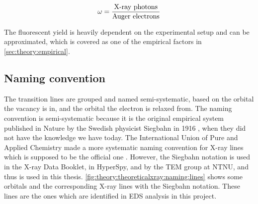 \begin{equation}
    \label{eq:theory:theoreticalxray:yield}
    \omega = \frac{\textnormal{X-ray photons}}{\textnormal{Auger electrons}}
\end{equation}


The fluorescent yield is heavily dependent on the experimental setup and can be approximated, which is covered as one of the empirical factors in \cref{sec:theory:empirical}.











%
%
\subsection{Naming convention}
\label{sec:theory:theoreticalxray:naming}

The transition lines are grouped and named semi-systematic, based on the orbital the vacancy is in, and the orbital the electron is relaxed from.
The naming convention is semi-systematic because it is the original empirical system published in Nature by the Swedish physicist Siegbahn in 1916 \cite{siegbahn_relations_1916}, when they did not have the knowledge we have today.
The International Union of Pure and Applied Chemistry made a more systematic naming convention for X-ray lines which is supposed to be the official one \cite[Ch. 4.2.4]{goldstein_scanning_2018}.
However, the Siegbahn notation is used in the X-ray Data Booklet, in HyperSpy, and by the TEM group at NTNU, and thus is used in this thesis.
\cref{fig:theory:theoreticalxray:naming:lines} shows some orbitals and the corresponding X-ray lines with the Siegbahn notation.
These lines are the ones which are identified in EDS analysis in this project.


